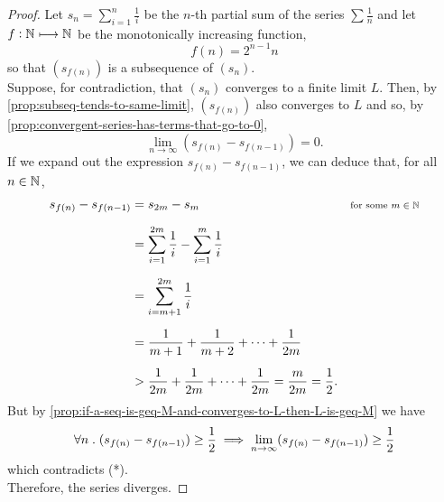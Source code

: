 \documentclass[../MathsNotesBase.tex]{subfiles}
\begin{document}
{	
		\bigskip
		\begin{proof}\nl[2]
			Let ${ s_n = \sum_{i=1}^n \frac{1}{i} }$ be the $n$-th partial sum of the series ${ \sum \frac{1}{n} }$ and let ${ f: \mathbb{N}^{} \longmapsto \mathbb{N}^{} }$ be the monotonically increasing function,
			\[ f(n) = 2^{n-1} n \]
			so that $(s_{f(n)})$ is a subsequence of $(s_n)$.\\
			
			Suppose, for contradiction, that $(s_n)$ converges to a finite limit $L$. Then, by \autoref{prop:subseq-tends-to-same-limit}, $(s_{f(n)})$ also converges to $L$ and so, by \autoref{prop:convergent-series-has-terms-that-go-to-0},
			\[ \lim_{n \to \infty} (s_{f(n)} - s_{f(n-1)}) = 0. \tag{*} \]
			\nl
			If we expand out the expression ${ s_{f(n)} - s_{f(n-1)} }$, we can deduce that, for all ${ n \in \mathbb{N}^{} }$,
			\[\begin{aligned}
				s_{f(n)} - s_{f(n-1)} &= s_{2m} - s_m  &\sidecomment{for some ${ m \in \N{} }$} \nn
				&= \sum_{i=1}^{2m} \frac{1}{i} - \sum_{i=1}^m \frac{1}{i} &\sidecomment{} \nn
				&= \sum_{i=m+1}^{2m} \frac{1}{i} &\sidecomment{} \nn
				&= \frac{1}{m+1} + \frac{1}{m+2} + \cdots + \frac{1}{2m} &\sidecomment{} \nn
				&> \frac{1}{2m} + \frac{1}{2m} + \cdots + \frac{1}{2m} = \frac{m}{2m} = \frac{1}{2}.
			\end{aligned}\]
			\nl
			But by \autoref{prop:if-a-seq-is-geq-M-and-converges-to-L-then-L-is-geq-M} we have
			\[ \forall n \;.\; (s_{f(n)} - s_{f(n-1)}) \geq \frac{1}{2} \implies \lim_{n \to \infty} (s_{f(n)} - s_{f(n-1)}) \geq \frac{1}{2} \]
			which contradicts (*).\\
			
			Therefore, the series diverges.
		\end{proof}
	
}
\end{document}
